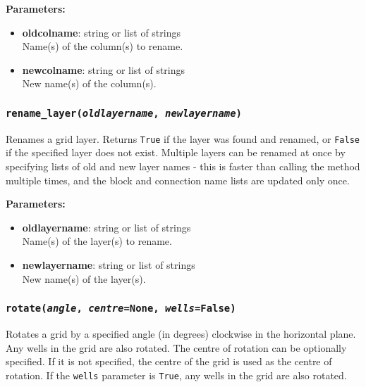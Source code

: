 \textbf{Parameters:}
\begin{itemize}
  \item \textbf{oldcolname}: string or list of strings\\
    Name(s) of the column(s) to rename.
  \item \textbf{newcolname}: string or list of strings\\
    New name(s) of the column(s).
\end{itemize}

\begin{snugshade}\subsubsection{\texttt{rename\_layer(\emph{oldlayername}, \emph{newlayername})}}\end{snugshade}
\label{sec:mulgrid:rename_layer}

Renames a grid layer.  Returns \texttt{True} if the layer was found and renamed, or \texttt{False} if the specified layer does not exist.  Multiple layers can be renamed at once by specifying lists of old and new layer names - this is faster than calling the method multiple times, and the block and connection name lists are updated only once.

\textbf{Parameters:}
\begin{itemize}
  \item \textbf{oldlayername}: string or list of strings\\
    Name(s) of the layer(s) to rename.
  \item \textbf{newlayername}: string or list of strings\\
    New name(s) of the layer(s).
\end{itemize}

\begin{snugshade}
\subsubsection{\texttt{rotate(\emph{angle}, \emph{centre}=\texttt{None}, \emph{wells}=\texttt{False})}}\end{snugshade}
\label{sec:mulgrid:rotate}

Rotates a grid by a specified angle (in degrees) clockwise in the horizontal plane.  Any wells in the grid are also rotated.  The centre of rotation can be optionally specified.  If it is not specified, the centre of the grid is used as the centre of rotation.  If the \texttt{wells} parameter is \texttt{True}, any wells in the grid are also rotated.

